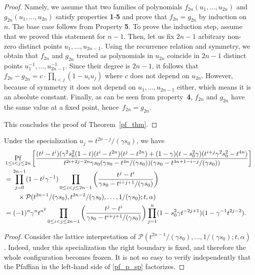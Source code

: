 \documentclass[ALCO,Unicode]{cedram}
\newcommand{\pf}{\mathop{\rm Pf}}
\begin{document}
\begin{proof}
	Namely, we assume that two families of polynomials $f_{2n}(u_1, \dots, u_{2n})$ and $g_{2n}(u_1, \dots, u_{2n})$ satisfy properties \textbf{1}-\textbf{5} and prove that $f_{2n} = g_{2n}$ by induction on $n$. The base case  follows from Property \textbf{5}. To prove the induction step, assume that we proved this statement for $n-1$. Then, let us fix $2n-1$ arbitrary non-zero distinct points $u_1, \dots, u_{2n-1}$. Using the recurrence relation and symmetry, we obtain that $f_{2n}$ and $g_{2n}$ treated as polynomials in $u_{2n}$ coincide in $2n-1$  distinct points $u_{1}^{-1}, \dots, u_{2n-1}^{-1}$. Since their degree is $2n-1$, it follows that $f_{2n} - g_{2n} = c \cdot \prod_{i<j}(1 - u_i u_j)$ where $c$ does not depend on $u_{2n}$. However, because of symmetry it does not depend on $u_1, \dots, u_{2n-1}$ either, which means it is an absolute constant. Finally, as can be seen from property~\textbf{4}, $f_{2n}$ and $g_{2n}$ have the same value at a fixed point, hence~$f_{2n} = g_{2n}$.
	
	This concludes the proof of Theorem~\ref{pf_thm}.
\end{proof}

\begin{coro}
	Under the specialization $u_j = t^{2n - j} / (\gamma s_{0})$, we have 
	\begin{equation} \label{pf_p_sp}
	\begin{split}
	&\pf_{1\leq i < j \leq 2n}
	\left[
	\frac{ (t^{j} - t^{i})(\gamma^2 s_0^2(1 - t)(t^{i} - t^{2n})(t^{j}- t^{2n}) + (1 - \gamma)(t-s_{0}^{2}\gamma)(t^{i+j}\gamma^2 s_0^2-t^{4n})}
	{t^{2i+2j-2n}\gamma s_0(\gamma s_0-t^{4n}/(\gamma s_0)) (\gamma s_0 -t^{4n+1-i-j}/(\gamma s_0))}
	\right]
	\\
	&=\prod_{j = 0}^{2n-1} (1 - t^j\gamma^{-1}) \prod_{0 \leq i<j \leq 2n-1}
	\left(
	\frac{t^j - t^i}{\gamma s_0 -t^{i+j+1} / (\gamma s_0)}
	\right)\\
	&\qquad\times
	\mathcal{P}(t^{2n - 1} / (\gamma s_{0}), t^{2n - 2} / (\gamma s_{0}), \dots, 1 / (\gamma s_{0}); t, \alpha)  \\
	&=(-1)^{n} \gamma^{n} t^{n^{2}} \prod_{0 \leq i<j \leq 2n-1}
	\left(
	\frac{t^j - t^i}{\gamma s_0 -t^{i+j+1} / (\gamma s_0)}
	\right)
	\prod_{j=1}^{n}(1 - s_{0}^{2}\gamma t^{-2j+1})(1 - \gamma^{-1} t^{2j-2})
	.
	\end{split}
	\end{equation}
\end{coro}
\begin{proof}
	Consider the lattice interpretation of $\mathcal{P}(t^{2n - 1} / (\gamma s_{0}), \dots, 1 / (\gamma s_{0}); t, \alpha)$. Indeed, under this specialization the right boundary is fixed, and therefore the whole configuration becomes frozen.
	It is not so easy to verify independently that the Pfaffian in the left-hand side of \eqref{pf_p_sp} factorizes.
\end{proof}
\end{document}
